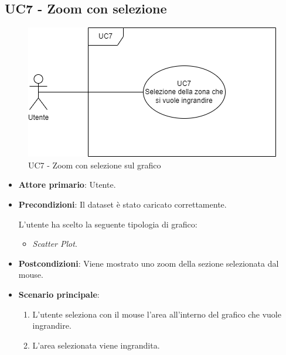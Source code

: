 \subsection{UC7 - Zoom con selezione}
\label{sec:UC7}
\begin{figure}[h!]
    \centering
    \includegraphics[scale=0.55]{../../assets/zoom_selezione.png}
    \caption{UC7 - Zoom con selezione sul grafico}
\end{figure}
\begin{itemize}
    \item \textbf{Attore primario}: Utente.
    \item \textbf{Precondizioni}: Il dataset è stato caricato correttamente. \par L'utente ha scelto la seguente tipologia di grafico:
    \begin{itemize}
    		\item \textit{Scatter Plot}.
    \end{itemize}
    \item \textbf{Postcondizioni}: Viene mostrato uno zoom della sezione selezionata dal mouse.
    \item \textbf{Scenario principale}:
          \begin{enumerate}
              \item L'utente seleziona con il mouse l'area all'interno del grafico che vuole ingrandire.
              \item L'area selezionata viene ingrandita.
          \end{enumerate}
\end{itemize}

